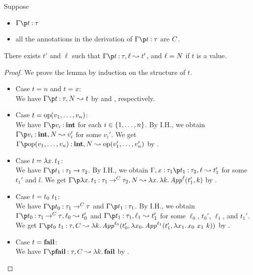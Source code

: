 \begin{lemma}
\label{lem:cps_total_term}
Suppose
\begin{itemize}
\item $\Gamma \p t \COL \tau$
\item all the annotations in the derivation of $\Gamma \p t \COL \tau$ are $C$.
\end{itemize}
There exists $t'$ and $\ell$ such that $\CPS{\Gamma}{t}{\tau}{\ell}{t'}$, and $\ell = N$ if $t$ is a value.
\end{lemma}
\begin{proof}
We prove the lemma by induction on the structure of $t$.

\begin{itemize}
\item Case $t = n$ and $t = x$: \\
      We have
      $\CPS{\Gamma}{t}{\tau}{\NC}{t}$ by  and , respectively.

\item Case $t = \mathrm{op}({v_1,\dots,v_n})$: \\
      We have $\Gamma \p v_i \COL \INT$ for each $i \in \{{1,\dots,n}\}$.
      By I.H., we obtain $\CPS{\Gamma}{v_i}{\INT}{\NC}{v_i'}$ for some $v_i'$.
      We get $\CPS{\Gamma}{\Op{v_1,\dots,v_n}}{\INT}{\NC}{\Op{v_1',\dots,v_n'}}$ by .

\item Case $t = \lambda{x}.\,{t_1}$: \\
      We have $\Gamma \p t_1 \COL \TFun{\tau_1}{\tau_2}$.
      By I.H., we obtain
      $\CPS{\Gamma,x\COL\tau_1}{t_1}{\tau_2}{\ell}{t_1'}$ for some $t_1'$ and $l$.
      We get
      $\CPS{\Gamma}{\Abs{x}{t_1}}{\TFunC{\tau_1}{\tau_2}}{\NC}{{\Abs{x}{\Abs{k}{\SApp{\ell}{t_1'}{k}}}}}$
      by .

\item Case $t = {t_0}~{t_1}$: \\
      We have $\Gamma \p t_0 \COL {\TFunL{\IC}{\tau_1}{\tau}}$ and $\Gamma \p t_1 \COL \tau_1$.
      By I.H., we obtain $\CPS{\Gamma}{t_0}{\TFunL{\IC}{\tau_1}{\tau}}{\ell_0}{t_0'}$ and
      $\CPS{\Gamma}{t_1}{\tau_1}{\ell_1}{t_1'}$ for some $\ell_0$, $t_0'$, $\ell_1$, and $t_1'$.
      We get $\CPS{\Gamma}{\App{t_0}{t_1}}{\tau}{\IC}{\Abs{k}{\SApp{\ell_0}{t_0'}{\Abs{x_0}{\SApp{\ell_1}{t_1'}{\Abs{x_1}{\App{\App{x_0}{x_1}}{k}}}}}}}$ by .

\item Case $t = \mathbf{fail}$: \\
      We have $\CPS{\Gamma}{\FAIL}{\tau}{\IC}{\Abs{k}{\FAIL}}$ by .


\end{itemize}
\end{proof}
